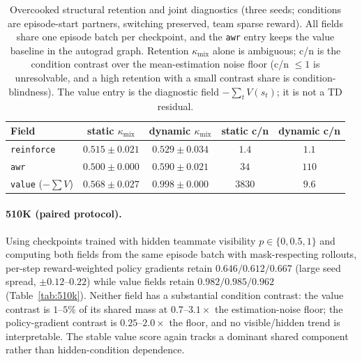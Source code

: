\documentclass{article}
\newcommand{\kmix}{\kappa_{\mathrm{mix}}}
\begin{document}
\begin{table}[t]
\caption{Overcooked structural retention and joint diagnostics (three
seeds; conditions are episode-start partners, switching preserved, team
sparse reward). All fields share one episode batch per checkpoint, and the
\texttt{awr} entry keeps the value baseline in the autograd graph. Retention
$\kmix$ alone is ambiguous; c/n is the condition contrast over the
mean-estimation noise floor (c/n $\le 1$ is unresolvable, and a high
retention with a small contrast share is condition-blindness). The value
entry is the diagnostic field
$-\sum_t V(s_t)$; it is not a TD residual.}
\label{tab:overcooked}
\begin{center}
\begin{tabular}{lcccc}
\toprule
Field & static $\kmix$ & dynamic $\kmix$ & static c/n & dynamic c/n \\
\midrule
\texttt{reinforce} & $0.515\pm0.021$ & $0.529\pm0.034$ & $1.4$ & $1.1$ \\
\texttt{awr} & $0.500\pm0.000$ & $0.590\pm0.021$ & $34$ & $110$ \\
\texttt{value} ($-\sum V$) & $0.568\pm0.027$ & $0.998\pm0.000$ & $3830$ & $9.6$ \\
\bottomrule
\end{tabular}
\end{center}
\end{table}

\paragraph{510K (paired protocol).}
Using checkpoints trained with hidden teammate visibility
$p\in\{0,0.5,1\}$ and computing both fields from the same episode batch with
mask-respecting rollouts, per-step reward-weighted policy gradients retain
$0.646/0.612/0.667$ (large seed spread, $\pm0.12$--$0.22$) while value fields
retain $0.982/0.985/0.962$ (Table~\ref{tab:510k}). Neither field has a
substantial condition contrast: the value contrast is $1$--$5\%$ of its shared
mass at $0.7$--$3.1\times$ the estimation-noise floor; the policy-gradient
contrast is $0.25$--$2.0\times$ the floor, and no visible/hidden trend is
interpretable. The stable value score again tracks a dominant shared
component rather than hidden-condition dependence.
\end{document}
